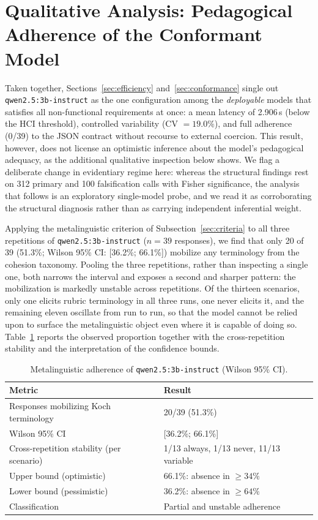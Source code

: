 \documentclass{sbc2023}%
\begin{document}
\section{Qualitative Analysis: Pedagogical Adherence of the Conformant Model}
\label{sec:qualitative}

Taken together, Sections~\ref{sec:efficiency} and~\ref{sec:conformance} single out \texttt{qwen2.5:3b-instruct} as the one configuration among the \textit{deployable} models that satisfies all non-functional requirements at once: a mean latency of 2.906\,s (below the HCI threshold), controlled variability (CV $=19.0\%$), and full adherence (0/39) to the JSON contract without recourse to external coercion. This result, however, does not license an optimistic inference about the model's pedagogical adequacy, as the additional qualitative inspection below shows. We flag a deliberate change in evidentiary regime here: whereas the structural findings rest on 312 primary and 100 falsification calls with Fisher significance, the analysis that follows is an exploratory single-model probe, and we read it as corroborating the structural diagnosis rather than as carrying independent inferential weight.

Applying the metalinguistic criterion of Subsection~\ref{sec:criteria} to all three repetitions of \texttt{qwen2.5:3b-instruct} ($n=39$ responses), we find that only 20 of 39 (51.3\%; Wilson 95\% CI: [36.2\%; 66.1\%]) mobilize any terminology from the cohesion taxonomy. Pooling the three repetitions, rather than inspecting a single one, both narrows the interval and exposes a second and sharper pattern: the mobilization is markedly unstable across repetitions. Of the thirteen scenarios, only one elicits rubric terminology in all three runs, one never elicits it, and the remaining eleven oscillate from run to run, so that the model cannot be relied upon to surface the metalinguistic object even where it is capable of doing so. Table~\ref{tab:metalinguistic} reports the observed proportion together with the cross-repetition stability and the interpretation of the confidence bounds.

\begin{table}[!ht]
\caption{Metalinguistic adherence of \texttt{qwen2.5:3b-instruct} (Wilson 95\% CI).}
\centering
\footnotesize
\begin{tabular}{@{}p{}p{}@{}}
\hline\hline
Metric & Result \\
\hline
Responses mobilizing Koch terminology & 20/39 (51.3\%) \\
Wilson 95\% CI & [36.2\%; 66.1\%] \\
Cross-repetition stability (per scenario) & 1/13 always, 1/13 never, 11/13 variable \\
Upper bound (optimistic) & 66.1\%: absence in $\geq 34\%$ \\
Lower bound (pessimistic) & 36.2\%: absence in $\geq 64\%$ \\
Classification & Partial and unstable adherence \\
\hline\hline
\end{tabular}
\label{tab:metalinguistic}
\end{table}
\end{document}
